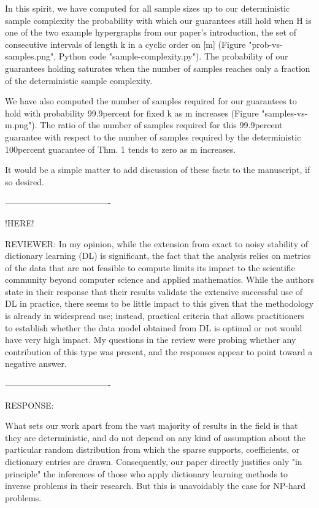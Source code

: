 In this spirit, we have computed for all sample sizes up to our deterministic sample complexity the probability with which our guarantees still hold when H is one of the two example hypergraphs from our paper's introduction, the set of consecutive intervals of length k in a cyclic order on [m] (Figure "prob-vs-samples.png", Python code "sample-complexity.py"). The probability of our guarantees holding saturates when the number of samples reaches only a fraction of the deterministic sample complexity. 

We have also computed the number of samples required for our guarantees to hold with probability 99.9percent for fixed k as m increases (Figure "samples-vs-m.png"). The ratio of the number of samples required for this 99.9percent guarantee with respect to the number of samples required by the deterministic 100percent guarantee of Thm. 1 tends to zero as m increases.

It would be a simple matter to add discussion of these facts to the manuscript, if so desired.

-------------------------------------

!HERE!

REVIEWER:
In my opinion, while the extension from exact to noisy stability of
dictionary learning (DL) is significant, the fact that the analysis relies
on metrics of the data that are not feasible to compute limits its impact
to the scientific community beyond computer science and applied
mathematics. While the authors state in their response that their results
validate the extensive successful use of DL in practice, there seems to be
little impact to this given that the methodology is already in widespread
use; instead, practical criteria that allows practitioners to establish
whether the data model obtained from DL is optimal or not would have very
high impact. My questions in the review were probing whether any
contribution of this type was present, and the responses appear to point
toward a negative answer.

-------------------------------------

RESPONSE:

What sets our work apart from the vast majority of results in the field is that they are deterministic, and do not depend on any kind of assumption about the particular random distribution from which the sparse supports, coefficients, or dictionary entries are drawn. Consequently, our paper directly justifies only "in principle" the inferences of those who apply dictionary learning methods to inverse problems in their research. But this is unavoidably the case for NP-hard problems.

